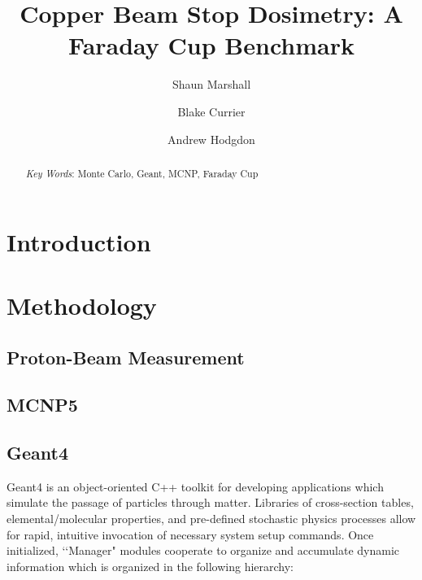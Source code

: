 \documentclass{mc2015}
\begin{document}
\title{Copper Beam Stop Dosimetry: A Faraday Cup Benchmark}

\author{Shaun Marshall}
\author{Blake Currier}

\author{Andrew Hodgdon}

\maketitle

\begin{abstract}
\lipsum[1]

\emph{Key Words}: Monte Carlo, Geant, MCNP, Faraday Cup
\end{abstract}

\section{Introduction}

\lipsum[2-4]

\section{Methodology}

\lipsum[5]

\subsection{Proton-Beam Measurement}

\lipsum[6]

\subsection{MCNP5}

\lipsum[7]

\subsection{Geant4}

Geant4 is an object-oriented C++ toolkit for developing applications which simulate the passage of particles through matter. Libraries of cross-section tables, elemental/molecular properties, and pre-defined stochastic physics processes allow for rapid, intuitive invocation of necessary system setup commands. Once initialized, \lq\lq Manager" modules cooperate to organize and accumulate dynamic information which is organized in the following hierarchy:
\end{document}
